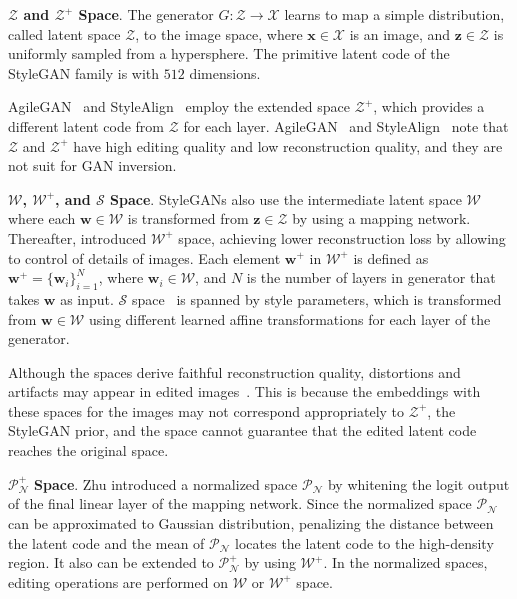 \documentclass[10pt,twocolumn,letterpaper]{article}
\newcommand{\z}{\bm{z}}
\newcommand{\w}{\bm{w}}
\newcommand{\wpls}{\bm{w}^{+}}
\newcommand{\PNS}{\mathcal{P}_{\mathcal{N}}}
\newcommand{\PPNS}{\mathcal{P}^{+}_{\mathcal{N}}}
\newcommand{\WS}{\mathcal{W}}
\newcommand{\WPS}{\mathcal{W}^{+}}
\newcommand{\ZS}{\mathcal{Z}}
\newcommand{\ZPS}{\mathcal{Z}^{+}}
\newcommand{\SSp}{\mathcal{S}}
\newcommand{\X}{\mathcal{X}}
\newcommand{\x}{\bm{x}}
\begin{document}
\noindent \textbf{$\ZS$ and $\ZPS$ Space}.
The generator $G: \ZS \to \X$ learns to map a simple distribution, called latent space $\ZS$, to the image space, 
where $\x \in \X$ is an image, and $\z \in \ZS$ is uniformly sampled from a hypersphere.
The primitive latent code of the StyleGAN family is with $512$ dimensions.

AgileGAN~\cite{song2021agilegan} and StyleAlign~\cite{wu2021stylealign} employ the extended space $\ZPS$, which provides a different latent code from $\ZS$ for each layer.
AgileGAN~\cite{song2021agilegan} and StyleAlign~\cite{wu2021stylealign} note that $\ZS$ and $\ZPS$
have high editing quality and low reconstruction quality, and they are not suit for GAN inversion.

\noindent \textbf{$\WS$, $\WPS$, and $\SSp$ Space}. 
StyleGANs also use the intermediate latent space $\WS$ where each $\w \in \WS$ is transformed from $\z \in \ZS$ by using a mapping network. 
Thereafter, \cite{abdal2019image2stylegan,abdal2020image2stylegan++} introduced $\WPS$ space, achieving lower reconstruction loss by allowing to control of details of images.
Each element $\wpls$ in $\WPS$ is defined as $\wpls\! = \{\w_i\}_{i=1}^{N}$, where $\w_i\in\WS$, and $N$ is the number of layers in generator that takes $\w$
as input.
$\SSp$ space~\cite{wu2021stylespace} is spanned by style parameters, which is transformed from $\w \in \WS$ using different learned affine transformations for each layer of the generator.

Although the spaces derive faithful reconstruction quality, distortions and artifacts may appear in edited images~\cite{wulff2020improving,zhu2020improved,song2021agilegan}.
This is because the embeddings with these spaces for the images may not correspond appropriately to $\ZPS$, the StyleGAN prior, 
and the space cannot guarantee that the edited latent code reaches the original space. 


\noindent $\PPNS$ \textbf{Space}. 
Zhu \etal\cite{zhu2020improved} introduced a normalized space $\PNS$ by whitening the logit output of the final linear layer of the mapping network.
Since the normalized space $\PNS$ can be approximated to Gaussian distribution,
penalizing the distance between the latent code and the mean of $\PNS$ locates the latent code to the high-density region.
It also can be extended to $\PPNS$ by using $\WPS$.
In the normalized spaces, editing operations are performed on $\WS$ or $\WPS$ space.
\end{document}
